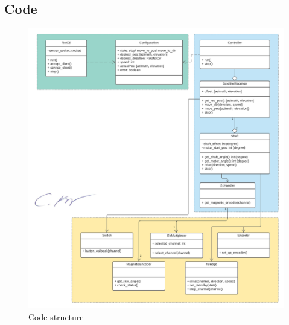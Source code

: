 \subsection{Code}


\begin{figure}[h]
	\centering
	\includegraphics[scale=0.5]{../art/SatelliteReceiver.pdf}
	\caption{Code structure}
\end{figure}
